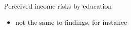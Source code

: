 \documentclass{beamer}
\begin{document}
\begin{frame}{Perceived income risks by education}
\begin{figure}[ht]
\begin{subfigure}[b]{0.46\textwidth}
		\end{subfigure}
	\end{figure}
	\begin{itemize}
			\item not the same to findings, for instance  
			\cite{meghir2004income}
		\end{itemize}
\end{frame}


\end{document}
